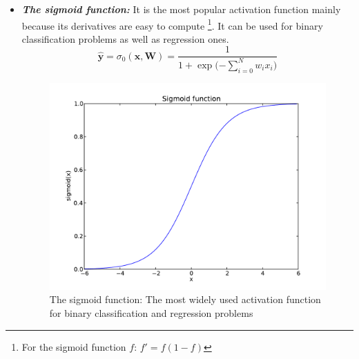 \documentclass[a4paper,11pt]{report}
\newcommand{\Important}[1]{\textbf{{\em #1}}}
\begin{document}
\begin{itemize}
				\item \Important{The sigmoid function:} It is the most popular activation function mainly because its derivatives are easy to compute \footnote{For the sigmoid function $f$: $f' = f(1 - f)$}. It can be used for binary classification problems as well as regression ones.\\
				\begin{equation}
					\mathbf{\hat{y}} = \sigma_{0}(\mathbf{x},\mathbf{W}) = \frac{1}{1 + \exp{(-\sum_{i=0}^{N} w_{i} x_{i}})}
				\end{equation}
				\begin{figure}[H]
					\begin{center}
						\includegraphics[width=3 in]{Images/NN/sigmoid.pdf}
						\caption[Activation function: The sigmoid]{The sigmoid function: The most widely used activation function for binary classification and regression problems}
						\label{fig:The sigmoid function}
					\end{center}
				\end{figure}    
       

\end{itemize}
\end{document}
